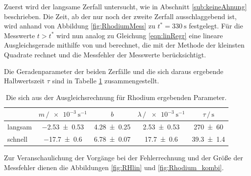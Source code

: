 Zuerst wird der langsame Zerfall untersucht, wie in Abschnitt \ref{sub:keineAhnung} beschrieben. 
Die Zeit, ab der nur noch der zweite Zerfall ausschlaggebend ist, wird anhand von Abbildung \ref{fig:RhodiumMess} zu $t^*=\SI{330}{\second}$ festgelegt.
Für die Messwerte $t>t^*$ wird nun analog zu Gleichung \eqref{eqn:linRegr} eine lineare Ausgleichsgerade mithilfe von 
\cite{scipy} und \cite{uncertainties} berechnet, die mit der Methode der kleinsten Quadrate rechnet und die Messfehler der Messwerte berücksichtigt. 

Die Geradenparameter der beiden Zerfälle und die sich daraus ergebende Halbwertszeit $\tau$ sind in Tabelle \ref{tab:Denkdirwasaus} zusammengestellt. 
\begin{table}
    \centering
    \caption{Die sich aus der Ausgleichsrechnung für Rhodium ergebenden Parameter.}
    \label{tab:Denkdirwasaus}
    \begin{tabular}{l c c c c}
        \toprule
         & $m\,/\SI{e-3}{\second\tothe{-1}}$ & $b$ & $\lambda\,/\,\SI{e-3}{\second\tothe{-1}}$ & $\tau\,/\,\si{\second}$ \\
        \midrule
        langsam & \num{-2.53+-0.53} & \num{4.28+-0.25} & \num{2.53+-0.53} & \num{270+-60}   \\
        schnell & \num{-17.7+-0.6}  & \num{6.78+-0.07} & \num{17.7+-0.6}  & \num{39.3+-1.4} \\
        \bottomrule
    \end{tabular}
\end{table}
Zur Veranschaulichung der Vorgänge bei der Fehlerrechnung und der Größe der Messfehler dienen die Abbildungen \ref{fig:RHlin} und \ref{fig:Rhodium_kombi}. 
